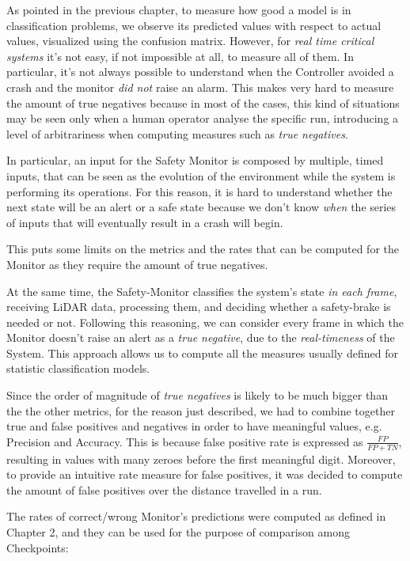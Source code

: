 As pointed in the previous chapter, to measure how good a model is in classification problems, we observe its predicted values with respect to actual values, visualized using the confusion matrix. However, for \textsl{real time critical systems} it's not easy, if not impossible at all, to measure all of them. In particular, it's not always possible to understand when the Controller avoided a crash and the monitor \textsl{did not} raise an alarm. This makes very hard to measure the amount of true negatives because in most of the cases, this kind of situations may be seen only when a human operator analyse the specific run, introducing a level of arbitrariness when computing measures such as \textsl{true negatives}.

In particular, an input for the Safety Monitor is composed by multiple, timed inputs, that can be seen as the evolution of the environment while the system is performing its operations. For this reason, it is hard to understand whether the next state will be an alert or a safe state because we don't know \textsl{when} the series of inputs that will eventually result in a crash will begin.

This puts some limits on the metrics and the rates that can be computed for the Monitor as they require the amount of true negatives.

At the same time, the Safety-Monitor classifies the system's state \textsl{in each frame}, receiving LiDAR data, processing them, and deciding whether a safety-brake is needed or not. Following this reasoning, we can consider every frame in which the Monitor doesn't raise an alert as a \textsl{true negative}, due to the \textsl{real-timeness} of the System.
This approach allows us to compute all the measures usually defined for statistic classification models.\newline

Since the order of magnitude of \textsl{true negatives} is likely to be much bigger than the the other metrics, for the reason just described, we had to combine together true and false positives and negatives in order to have meaningful values, e.g. Precision and Accuracy. This is because false positive rate is expressed as $\frac{FP}{FP+TN}$, resulting in values with many zeroes before the first meaningful digit. Moreover, to provide an intuitive rate measure for false positives, it was decided to compute the amount of false positives over the distance travelled in a run.

The rates of correct/wrong Monitor's predictions were computed as defined in Chapter 2, and they can be used for the purpose of comparison among Checkpoints:

